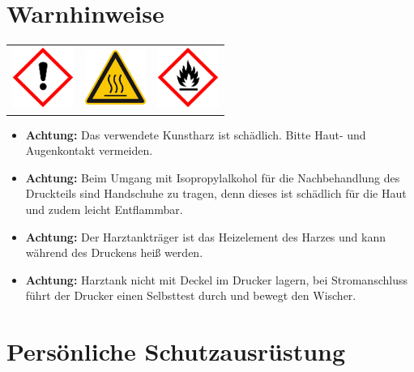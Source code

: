 \documentclass{\basedir/fablab-document}
\begin{document}
\section{Warnhinweise}
\begin{table}[h]
	\centering
	\begin{tabular}{ccc}
		
		\includegraphics[width=2cm]{bilder/GHSa.png}  &
		\includegraphics[width=2cm]{bilder/GHShs.jpg}  & \includegraphics[width=2cm]{bilder/GHSf.png} \\
	\end{tabular}
\end{table}

\begin{itemize}
	\item \textbf{Achtung:} Das verwendete Kunstharz ist schädlich. Bitte Haut- und Augenkontakt vermeiden. \\
	\item \textbf{Achtung:} Beim Umgang mit Isopropylalkohol für die Nachbehandlung des Druckteils sind Handschuhe zu tragen, denn dieses ist schädlich für die Haut und zudem leicht Entflammbar.\\
	
	\item \textbf{Achtung:} Der Harztankträger ist das Heizelement des Harzes und kann während des Druckens heiß werden.
	
	\item \textbf{Achtung:} Harztank nicht mit Deckel im Drucker lagern, bei Stromanschluss führt der Drucker einen Selbsttest durch und bewegt den Wischer.
\end{itemize}


\section{Persönliche Schutzausrüstung}
\end{document}
